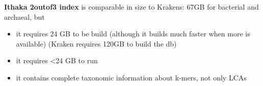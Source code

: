 \documentclass[portrait,final,a0paper,fontscale=0.277]{baposter}
\begin{document}
\begin{poster}
{  
{\bf Ithaka 2outof3 index} is comparable in size to Krakens: 67GB for bacterial and archaeal, but
\vspace{-0.7em}
\begin{itemize}[leftmargin=*]
\setlength\itemsep{-0.2em}
\item it requires 24 GB to be build (although it builds much faster when more is available) (Kraken requires 120GB to build the db)
\item it requires <24 GB to run
\item it contains complete taxonomic information about k-mers, not only LCAs  
\end{itemize}
\vspace{0.3em}
}



\end{poster}
\end{document}
